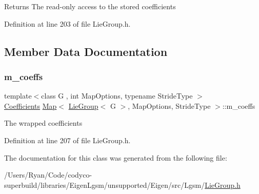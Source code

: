 \begin{DoxyReturn}{Returns}
The read-\/only access to the stored coefficients 
\end{DoxyReturn}


Definition at line 203 of file Lie\+Group.\+h.



\subsection{Member Data Documentation}
\hypertarget{class_map_3_01_lie_group_3_01_g_01_4_00_01_map_options_00_01_stride_type_01_4_ab567fb9415879d9fa0fcf35465dc0beb}{}\label{class_map_3_01_lie_group_3_01_g_01_4_00_01_map_options_00_01_stride_type_01_4_ab567fb9415879d9fa0fcf35465dc0beb} 
\subsubsection{\texorpdfstring{m\+\_\+coeffs}{m\_coeffs}}
{\footnotesize\ttfamily template$<$class G , int Map\+Options, typename Stride\+Type $>$ \\
\hyperlink{class_map_3_01_lie_group_3_01_g_01_4_00_01_map_options_00_01_stride_type_01_4_a3140b440390b3c15c7361ab182a91f91}{Coefficients} \hyperlink{class_map_3_01_lie_group_3_01_g_01_4_00_01_map_options_00_01_stride_type_01_4_a141753f9a4186911b53b5b25cfd716ed}{Map}$<$ \hyperlink{class_lie_group}{Lie\+Group}$<$ G $>$, Map\+Options, Stride\+Type $>$\+::m\+\_\+coeffs\hspace{0.3cm}{\ttfamily [protected]}}

The wrapped coefficients 

Definition at line 207 of file Lie\+Group.\+h.



The documentation for this class was generated from the following file\+:\begin{DoxyCompactItemize}
\item 
/\+Users/\+Ryan/\+Code/codyco-\/superbuild/libraries/\+Eigen\+Lgsm/unsupported/\+Eigen/src/\+Lgsm/\hyperlink{_lie_group_8h}{Lie\+Group.\+h}\end{DoxyCompactItemize}
